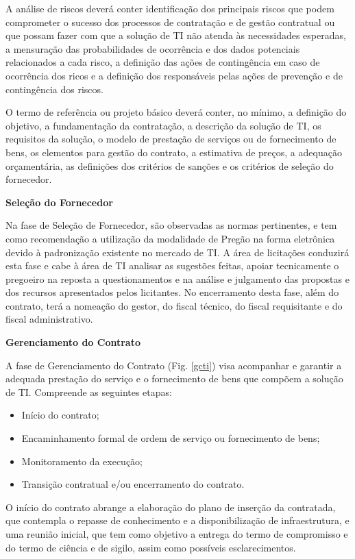 A análise de riscos deverá conter identificação dos principais riscos que podem comprometer o sucesso dos processos de contratação e de gestão contratual ou que possam fazer com que a solução de TI não atenda às necessidades esperadas, a mensuração das probabilidades de ocorrência e dos dados potenciais relacionados a cada risco, a definição das ações de contingência em caso de ocorrência dos ricos e a definição dos responsáveis pelas ações de prevenção e de contingência dos riscos.

O termo de referência ou projeto básico deverá conter, no mínimo, a definição do objetivo, a fundamentação da contratação, a descrição da solução de TI, os requisitos da solução, o modelo de prestação de serviços ou de fornecimento de bens, os elementos para gestão do contrato, a estimativa de preços, a adequação orçamentária, as definições dos critérios de sanções e os critérios de seleção do fornecedor. 

\textbf {Seleção do Fornecedor}

Na fase de Seleção de Fornecedor, são observadas as normas pertinentes, e tem como recomendação a utilização da modalidade de Pregão na forma eletrônica devido à padronização existente no mercado de TI.  A área de licitações conduzirá esta fase e cabe à área de TI analisar as sugestões feitas, apoiar tecnicamente o pregoeiro na reposta a questionamentos e na análise e julgamento das propostas e dos recursos apresentados pelos licitantes. No encerramento desta fase, além do contrato, terá a nomeação do gestor, do fiscal técnico, do fiscal requisitante e do fiscal administrativo.

\textbf {Gerenciamento do Contrato}

A fase de Gerenciamento do Contrato (Fig. \ref{gcti}) visa acompanhar e garantir a adequada prestação do serviço e o fornecimento de bens que compõem a solução de TI. Compreende as seguintes etapas: \begin{itemize}
\item Início do contrato; 
\item Encaminhamento formal de ordem de serviço ou fornecimento de bens; 
\item Monitoramento da execução; 
\item Transição contratual e/ou encerramento do contrato. 
\end{itemize}

O início do contrato abrange a elaboração do plano de inserção da contratada, que contempla o repasse de conhecimento e a disponibilização de infraestrutura, e uma reunião inicial, que tem como objetivo a entrega do termo de compromisso e do termo de ciência e de sigilo, assim como possíveis esclarecimentos. 


